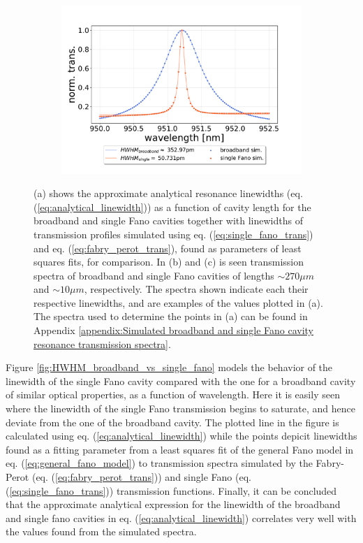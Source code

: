 \begin{figure}[h!]
\begin{subfigure}[c]{0.49\textwidth}
        \includegraphics[width=\textwidth]{figures/sim_single_vs_broadband_10um.pdf}
        \caption{}
        \label{fig:10um_broadband_and_single_fano_peak}
    \end{subfigure}
    \caption{(a) shows the approximate analytical resonance linewidths (eq. (\ref{eq:analytical_linewidth})) as a function of cavity length for the broadband and single Fano cavities together with linewidths of transmission profiles simulated using eq. (\ref{eq:single_fano_trans}) and eq. (\ref{eq:fabry_perot_trans}), found as parameters of least squares fits, for comparison. In (b) and (c) is seen transmission spectra of broadband and single Fano cavities of lengths $\sim 270 \mu m$ and $\sim 10 \mu m$, respectively. The spectra shown indicate each their respective linewidths, and are examples of the values plotted in (a). The spectra used to determine the points in (a) can be found in Appendix \ref{appendix:Simulated broadband and single Fano cavity resonance transmission spectra}.}
\end{figure}

Figure \ref{fig:HWHM_broadband_vs_single_fano} models the behavior of the linewidth of the single Fano cavity compared with the one for a broadband cavity of similar optical properties, as a function of wavelength. Here it is easily seen where the linewidth of the single Fano transmission begins to saturate, and hence deviate from the one of the broadband cavity. The plotted line in the figure is calculated using eq. (\ref{eq:analytical_linewidth}) while the points depicit linewidths found as a fitting parameter from a least squares fit of the general Fano model in eq. (\ref{eq:general_fano_model}) to transmission spectra simulated by the Fabry-Perot (eq. (\ref{eq:fabry_perot_trans})) and single Fano (eq. (\ref{eq:single_fano_trans})) transmission functions. Finally, it can be concluded that the approximate analytical expression for the linewidth of the broadband and single fano cavities in eq. (\ref{eq:analytical_linewidth}) correlates very well with the values found from the simulated spectra.

